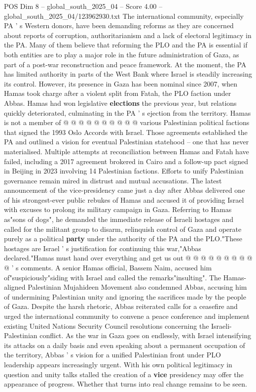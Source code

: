 \begin{textsample}{POS Dim 8 – global\_south\_2025\_04 – Score 4.00 – global\_south\_2025\_04/123962930.txt}
The international community, especially PA ' s Western donors, have been demanding reforms as they are concerned about reports of corruption, authoritarianism and a lack of electoral legitimacy in the PA.
Many of them believe that reforming the PLO and the PA is essential if both entities are to play a major role in the future administration of Gaza, as part of a post-war reconstruction and peace framework.
At the moment, the PA has limited authority in parts of the West Bank where Israel is steadily increasing its control.
However, its presence in Gaza has been nominal since 2007, when Hamas took charge after a violent split from Fatah, the PLO faction under Abbas.
Hamas had won legislative \textbf{elections} the previous year, but relations quickly deteriorated, culminating in the PA ' s ejection from the territory.
Hamas is not a member of @ @ @ @ @ @ @ @ @ @ various Palestinian political factions that signed the 1993 Oslo Accords with Israel.
Those agreements established the PA and outlined a vision for eventual Palestinian statehood -- one that has never materialised.
Multiple attempts at reconciliation between Hamas and Fatah have failed, including a 2017 agreement brokered in Cairo and a follow-up pact signed in Beijing in 2023 involving 14 Palestinian factions.
Efforts to unify Palestinian governance remain mired in distrust and mutual accusations.
The latest announcement of the vice-presidency came just a day after Abbas delivered one of his strongest-ever public rebukes of Hamas and accused it of providing Israel with excuses to prolong its military campaign in Gaza.
Referring to Hamas as"sons of dogs", he demanded the immediate release of Israeli hostages and called for the militant group to disarm, relinquish control of Gaza and operate purely as a political \textbf{party} under the authority of the PA and the PLO."These hostages are Israel ' s justification for continuing this war,"Abbas declared."Hamas must hand over everything and get us out @ @ @ @ @ @ @ @ @ @ ' s comments.
A senior Hamas official, Bassem Naim, accused him of"suspiciously"siding with Israel and called the remarks"insulting".
The Hamas-aligned Palestinian Mujahideen Movement also condemned Abbas, accusing him of undermining Palestinian unity and ignoring the sacrifices made by the people of Gaza.
Despite the harsh rhetoric, Abbas reiterated calls for a ceasefire and urged the international community to convene a peace conference and implement existing United Nations Security Council resolutions concerning the Israeli-Palestinian conflict.
As the war in Gaza goes on endlessly, with Israel intensifying its attacks on a daily basis and even speaking about a permanent occupation of the territory, Abbas ' s vision for a unified Palestinian front under PLO leadership appears increasingly urgent.
With his own political legitimacy in question and unity talks stalled the creation of a \textbf{vice} presidency may offer the appearance of progress.
Whether that turns into real change remains to be seen.

\end{textsample}

